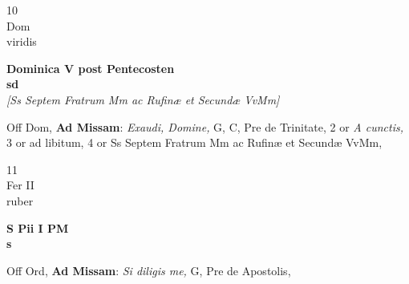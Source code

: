 \documentclass[10pt, openany]{book}
\begin{document}
        \begin{center}
            \begin{minipage}{3.5in}
                \vspace{2em}
                \begin{minipage}{0.5in}
                    {\Huge 10} \\
                    {\normalsize Dom} \\
                    {\normalsize viridis}
                \end{minipage}
                \begin{minipage}{3.0in}
                    \textbf{ \large Dominica V post Pentecosten \\
                    \textnormal{\normalsize sd}} \\ \textit{[Ss Septem Fratrum Mm ac Rufinæ et Secundæ VvMm]} \\ 
                \end{minipage}
                \begin{justify}Off Dom, \textbf{Ad Missam}: \textit{Exaudi, Domine,} G, C, Pre de Trinitate, 2 or \textit{A cunctis,} 3 or ad libitum, 4 or Ss Septem Fratrum Mm ac Rufinæ et Secundæ VvMm,   
                \end{justify}
            \end{minipage}
        \end{center}
    
        \begin{center}
            \begin{minipage}{3.5in}
                \vspace{2em}
                \begin{minipage}{0.5in}
                    {\Huge 11} \\
                    {\normalsize Fer II} \\
                    {\normalsize ruber}
                \end{minipage}
                \begin{minipage}{3.0in}
                    \textbf{ \large S Pii I PM \\
                    \textnormal{\normalsize s}} \\ 
                \end{minipage}
                \begin{justify}Off Ord, \textbf{Ad Missam}: \textit{Si diligis me,} G, Pre de Apostolis,   
                \end{justify}
            \end{minipage}
        \end{center}
    
\end{document}
